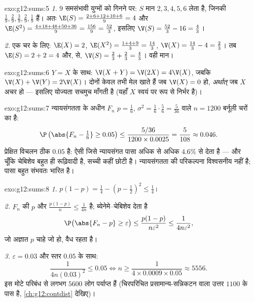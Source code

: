 \begin{solution}{exo:g12:sums:5}
\emph{1.} $9$ समसंभावी युग्मों को गिनने पर: $S$ मान $2, 3, 4, 5, 6$ लेता है, जिनकी
 $\frac19, \frac29, \frac39, \frac29, \frac19$ हैं। अतः $\E(S) = \frac{2 + 6 + 12 + 10 + 6}{9} = 4$ और $\E(S^2) = \frac{4 + 18 + 48 + 50 + 36}{9} = \frac{156}{9} = \frac{52}{3}$, इसलिए $\V(S) = \frac{52}{3} - 16 = \frac43$।

\emph{2.} एक चर के लिए: $\E(X) = 2$, $\E(X^2) = \frac{1 + 4 + 9}{3} = \frac{14}{3}$, $\V(X) = \frac{14}{3} - 4 = \frac23$। तब $\E(S) = 2 + 2 = 4$ और,  से, $\V(S) = \frac23 + \frac23 = \frac43$।
वही मान।
\end{solution}

\begin{solution}{exo:g12:sums:6}
$Y = X$ के साथ: $\V(X + Y) = \V(2X) = 4\V(X)$, जबकि $\V(X) + \V(Y) = 2\V(X)$। दोनों केवल तभी मेल खाते हैं जब $\V(X) = 0$ हो,
\emph{अर्थात्} जब $X$ अचर हो --- इसलिए योज्यता सचमुच  माँगती है
(यहाँ $X$ स्वयं पर  रूप से निर्भर है)।
\end{solution}

\begin{solution}{exo:g12:sums:7}
न्यायसंगतता के अधीन $F_n$ $p = \frac16$, $\sigma^2 = \frac16\cdot\frac56 = \frac{5}{36}$ वाले $n = 1200$ बर्नूली चरों का  है:
\[
\P\left(\abs{F_n - \tfrac16} \geq 0.05\right)
\leq \frac{5/36}{1200 \times 0.0025} = \frac{5}{108} \approx 0.046 .
\]
प्रेक्षित विचलन ठीक $0.05$ है: ऐसी  जिसे न्यायसंगत पासा अधिक से अधिक $4.6\%$
 से देता है --- और चूँकि चेबिशेव बहुत ही रूढ़िवादी है, सच्ची 
कहीं छोटी है। न्यायसंगतता की परिकल्पना विश्वसनीय नहीं है; पासा बहुत संभवतः
भारित है।
\end{solution}

\begin{solution}{exo:g12:sums:8}
\emph{1.} $p(1-p) = \frac14 - \left(p - \frac12\right)^2 \leq \frac14$।

\emph{2.} $F_n$ की  $p$ और  $\frac{p(1-p)}{n} \leq \frac{1}{4n}$ है; ब्येनेमे--चेबिशेव देता है
\[
\P\bigl(\abs{F_n - p} \geq \varepsilon\bigr)
\leq \frac{p(1-p)}{n\varepsilon^2} \leq \frac{1}{4n\varepsilon^2},
\]
जो अज्ञात $p$ चाहे जो हो, वैध रहता है।

\emph{3.} $\varepsilon = 0.03$ और स्तर $0.05$ के साथ:
\[
\frac{1}{4n(0.03)^2} \leq 0.05
\iff n \geq \frac{1}{4 \times 0.0009 \times 0.05} \approx 5556 .
\]
इस मोटे परिबंध से लगभग $5600$ लोग पर्याप्त हैं (चिरपरिचित प्रसामान्य-सन्निकटन
वाला उत्तर $1100$ के पास है, \cref{ch:g12:contdist} देखिए)।
\end{solution}

